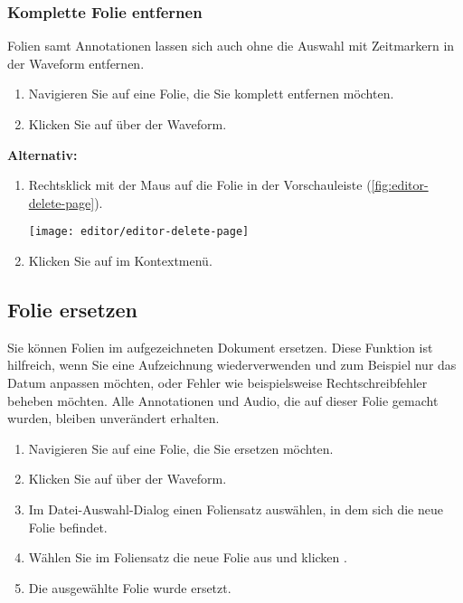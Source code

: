 \subsubsection{Komplette Folie entfernen}
Folien samt Annotationen lassen sich auch ohne die Auswahl mit Zeitmarkern in der Waveform entfernen.

\begin{enumerate}
	\item Navigieren Sie auf eine Folie, die Sie komplett entfernen möchten.
	\item Klicken Sie auf  \editorcutpage{} über der Waveform.
\end{enumerate}

\textbf{Alternativ:}

\begin{enumerate}
	\item Rechtsklick mit der Maus auf die Folie in der Vorschauleiste (\autoref{fig:editor-delete-page}).
	
	\begin{minipage}{0.9\textwidth}
		\centering
		\captionsetup{type=figure}
		\texttt{[image: editor/editor-delete-page]}
		\label{fig:editor-delete-page}
	\end{minipage}

	\item Klicken Sie auf  im Kontextmenü.
\end{enumerate}


\subsection{Folie ersetzen}
Sie können Folien im aufgezeichneten Dokument ersetzen. Diese Funktion ist hilfreich, wenn Sie eine Aufzeichnung wiederverwenden und zum Beispiel nur das Datum anpassen möchten, oder Fehler wie beispielsweise Rechtschreibfehler beheben möchten. Alle Annotationen und Audio, die auf dieser Folie gemacht wurden, bleiben unverändert erhalten.

\begin{enumerate}
	\item Navigieren Sie auf eine Folie, die Sie ersetzen möchten.
	\item Klicken Sie auf  \editorreplacepage{} über der Waveform.
	\item Im Datei-Auswahl-Dialog einen Foliensatz auswählen, in dem sich die neue Folie befindet.
	\item Wählen Sie im Foliensatz die neue Folie aus und klicken .
	\item Die ausgewählte Folie wurde ersetzt.
\end{enumerate}


